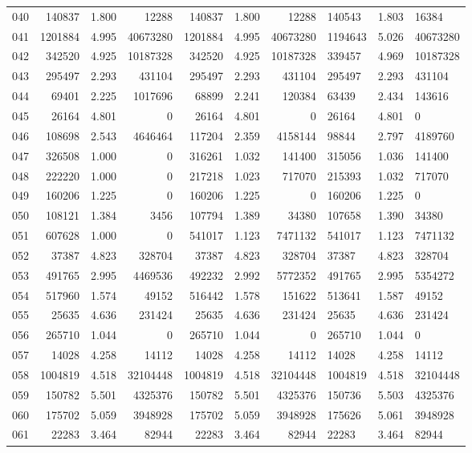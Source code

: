 \begin{longtable}{crrrrrr}
040 & 140837 & 1.800 & 12288 & 140837 & 1.800 & 12288 & 140543 & 1.803 & 16384 \\
041 & 1201884 & 4.995 & 40673280 & 1201884 & 4.995 & 40673280 & 1194643 & 5.026 & 40673280 \\
042 & 342520 & 4.925 & 10187328 & 342520 & 4.925 & 10187328 & 339457 & 4.969 & 10187328 \\
043 & 295497 & 2.293 & 431104 & 295497 & 2.293 & 431104 & 295497 & 2.293 & 431104 \\
044 & 69401 & 2.225 & 1017696 & 68899 & 2.241 & 120384 & 63439 & 2.434 & 143616 \\
045 & 26164 & 4.801 & 0 & 26164 & 4.801 & 0 & 26164 & 4.801 & 0 \\
046 & 108698 & 2.543 & 4646464 & 117204 & 2.359 & 4158144 & 98844 & 2.797 & 4189760 \\
047 & 326508 & 1.000 & 0 & 316261 & 1.032 & 141400 & 315056 & 1.036 & 141400 \\
048 & 222220 & 1.000 & 0 & 217218 & 1.023 & 717070 & 215393 & 1.032 & 717070 \\
049 & 160206 & 1.225 & 0 & 160206 & 1.225 & 0 & 160206 & 1.225 & 0 \\
050 & 108121 & 1.384 & 3456 & 107794 & 1.389 & 34380 & 107658 & 1.390 & 34380 \\
051 & 607628 & 1.000 & 0 & 541017 & 1.123 & 7471132 & 541017 & 1.123 & 7471132 \\
052 & 37387 & 4.823 & 328704 & 37387 & 4.823 & 328704 & 37387 & 4.823 & 328704 \\
053 & 491765 & 2.995 & 4469536 & 492232 & 2.992 & 5772352 & 491765 & 2.995 & 5354272 \\
054 & 517960 & 1.574 & 49152 & 516442 & 1.578 & 151622 & 513641 & 1.587 & 49152 \\
055 & 25635 & 4.636 & 231424 & 25635 & 4.636 & 231424 & 25635 & 4.636 & 231424 \\
056 & 265710 & 1.044 & 0 & 265710 & 1.044 & 0 & 265710 & 1.044 & 0 \\
057 & 14028 & 4.258 & 14112 & 14028 & 4.258 & 14112 & 14028 & 4.258 & 14112 \\
058 & 1004819 & 4.518 & 32104448 & 1004819 & 4.518 & 32104448 & 1004819 & 4.518 & 32104448 \\
059 & 150782 & 5.501 & 4325376 & 150782 & 5.501 & 4325376 & 150736 & 5.503 & 4325376 \\
060 & 175702 & 5.059 & 3948928 & 175702 & 5.059 & 3948928 & 175626 & 5.061 & 3948928 \\
061 & 22283 & 3.464 & 82944 & 22283 & 3.464 & 82944 & 22283 & 3.464 & 82944 \\

\end{longtable}

